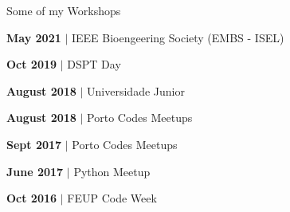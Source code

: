 \documentclass[11pt]{article}
\begin{document}
\bigskip
\centerline{\sc\large Some of my Workshops}
\begin{multicols}{2}
\setlength{\columnseprule}{0.4pt}
\begin{samepage}\textbf{May 2021} $\vert$ IEEE Bioengeering Society (EMBS - ISEL)
\\\par\end{samepage}\begin{samepage}\textbf{Oct 2019} $\vert$ DSPT Day
\\\par\end{samepage}\begin{samepage}\textbf{August 2018} $\vert$ Universidade Junior
\\\par\end{samepage}\begin{samepage}\textbf{August 2018} $\vert$ Porto Codes Meetups
\\\par\end{samepage}\begin{samepage}\textbf{Sept 2017} $\vert$ Porto Codes Meetups
\\\par\end{samepage}\begin{samepage}\textbf{June 2017} $\vert$ Python Meetup
\\\par\end{samepage}\begin{samepage}\textbf{Oct 2016} $\vert$ FEUP Code Week
\\\par\end{samepage}
\end{multicols}

\end{document}
